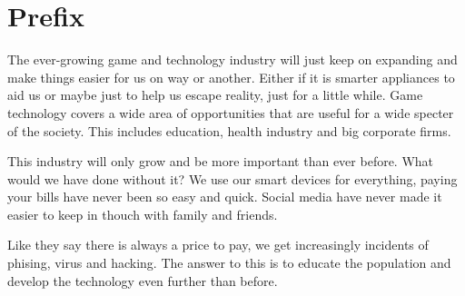 \chapter*{Prefix}

The ever-growing game and technology industry will just keep on expanding and make things easier for us on way or another. 
Either if it is smarter appliances to aid us or maybe just to help us escape reality, just for a little while. Game technology covers a wide area of opportunities that are useful for a wide specter of the society. This includes education, health industry and big corporate firms.

This industry will only grow and be more important than ever before. What would we have done without it? We use our smart devices for everything, paying your bills have never been so easy and quick. Social media have never made it easier to keep in thouch with family and friends.

Like they say there is always a price to pay, we get increasingly incidents of phising, virus and hacking. The answer to this is to educate the population and develop the technology even further than before.